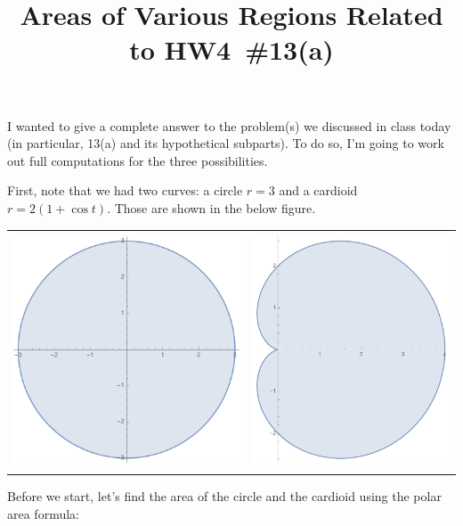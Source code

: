 \documentclass[12pt]{article}
\title{\vspace{-0.75in}\Huge{Areas of Various Regions Related to HW4~\#13(a)}\vspace{-0.5in}}
\date{}
\begin{document}
	\maketitle

	I wanted to give a complete answer to the problem(s) we discussed in class today (in particular, 13(a) and its hypothetical subparts). To do so, I'm going to work out full computations for the three possibilities.
	
	First, note that we had two curves: a circle $r=3$ and a cardioid $r=2(1+\cos{t})$. Those are shown in the below figure.
	
	\begin{tabular}{C{3.5in}C{3.5in}}
		\includegraphics[height=2.75in]{circle} &
		\includegraphics[height=2.75in]{cardioid}
	\end{tabular}

	\vspace{3mm}
	Before we start, let's find the area of the circle and the cardioid using the polar area formula:
	\vspace{-3mm}
	
\end{document}
